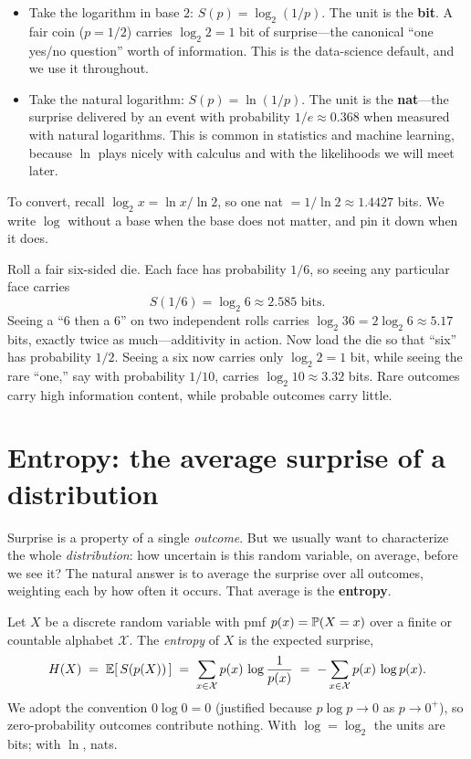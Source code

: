 \begin{itemize}
  \item Take the logarithm in base $2$: $S(p) = \log_2(1/p)$. The unit is the \textbf{bit}. A fair coin
        ($p = 1/2$) carries $\log_2 2 = 1$ bit of surprise---the canonical ``one yes/no question''
        worth of information. This is the data-science default, and we use it throughout.
  \item Take the natural logarithm: $S(p) = \ln(1/p)$. The unit is the \textbf{nat}---the surprise
        delivered by an event with probability $1/e \approx 0.368$ when measured with natural logarithms.
        This is common in statistics and machine learning, because $\ln$ plays nicely with calculus and
        with the likelihoods we will meet later.
\end{itemize}

To convert, recall $\log_2 x = \ln x / \ln 2$, so one nat $= 1/\ln 2 \approx 1.4427$ bits. We write $\log$
without a base when the base does not matter, and pin it down when it does.

\begin{example}
\label{ch33:die-surprise}
Roll a fair six-sided die. Each face has probability $1/6$, so seeing any particular face carries
\[
  S(1/6) = \log_2 6 \approx 2.585 \text{ bits}.
\]
Seeing a ``$6$ then a $6$'' on two independent rolls carries $\log_2 36 = 2\log_2 6 \approx 5.17$ bits,
exactly twice as much---additivity in action. Now load the die so that ``six'' has probability $1/2$.
Seeing a six now carries only $\log_2 2 = 1$ bit, while seeing the rare ``one,''
say with probability $1/10$, carries $\log_2 10 \approx 3.32$ bits. Rare outcomes carry
high information content, while probable outcomes carry little.
\end{example}

\section{Entropy: the average surprise of a distribution}
\label{ch33:entropy}

Surprise is a property of a single \emph{outcome}. But we usually want to characterize the whole
\emph{distribution}: how uncertain is this random variable, on average, before we see it? The natural
answer is to average the surprise over all outcomes, weighting each by how often it occurs. That average
is the \textbf{entropy}.

\begin{definition}
\label{ch33:def-entropy}
Let $X$ be a discrete random variable with pmf $p(x) = \P(X = x)$ over a finite or countable alphabet
$\mathcal{X}$. The \emph{entropy} of $X$ is the expected surprise,
\[
  H(X) \;=\; \E\!\left[\,S(p(X))\,\right]
        \;=\; \sum_{x \in \mathcal{X}} p(x)\,\log\frac{1}{p(x)}
        \;=\; -\sum_{x \in \mathcal{X}} p(x)\,\log p(x).
\]
We adopt the convention $0\log 0 = 0$ (justified because $p\log p \to 0$ as $p \to 0^+$), so
zero-probability outcomes contribute nothing. With $\log = \log_2$ the units are bits; with $\ln$, nats.
\end{definition}

